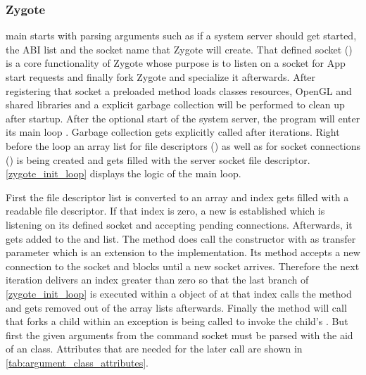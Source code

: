 \subsubsection{Zygote}\label{section:zygote}
 main starts with parsing arguments such as if a system
server should get started, the ABI list and the socket name that Zygote will
create. That defined socket () is a core functionality of Zygote whose purpose
is to listen on a socket for App start requests and finally fork Zygote and specialize it afterwards. After registering that socket a preloaded method loads classes
resources, OpenGL and shared libraries and a explicit garbage collection
 will be performed to clean up after startup. After the optional start of the system server, the program will enter its main loop
. Garbage collection gets explicitly called
after  iterations. Right before the loop an array list for file descriptors () as well as for socket connections () is being
created and  gets filled with the server socket file descriptor.
\autoref{zygote_init_loop} displays the logic of the main loop.



First the file descriptor list is converted to an array and index gets
filled with a readable file descriptor. If that index is zero,
a new  is established which is listening
on its defined socket and accepting pending connections.
Afterwards, it gets added to the 
and  list.
The  method does
call the  constructor with 
as transfer parameter which is an extension to the 
implementation. Its  method accepts a new connection
to the socket and blocks until a new socket arrives.
Therefore the next iteration delivers an index greater than zero so that
the last  branch of \autoref{zygote_init_loop} is executed within
a  object of  at that index calls
the  method and gets removed out of the array lists afterwards.
Finally the  method will call 
that forks a child within an exception is being called to invoke the child's
.
But first the given arguments from the command socket must be parsed with the
aid of an  class. Attributes that are needed for the later  call are shown in \autoref{tab:argument_class_attributes}.


